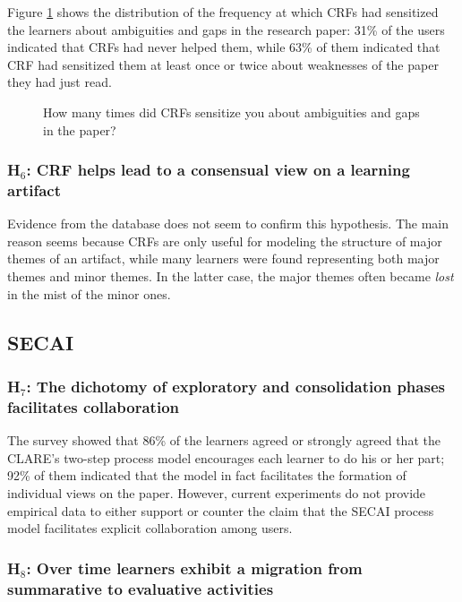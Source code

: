 Figure \ref{fig:ambiguity} shows the distribution of the frequency at which
CRFs had sensitized the learners about ambiguities and gaps in the research
paper: 31\% of the users indicated that CRFs had never helped them, while
63\% of them indicated that CRF had sensitized them at least once or twice
about weaknesses of the paper they had just read.

\begin{figure}[htbp]
  \caption{How many times did CRFs sensitize you about ambiguities and gaps
  in the paper?} 
  \label{fig:ambiguity}
\end{figure}


\subsubsection{H\(_6\): CRF helps lead to a consensual view on a learning
artifact}

Evidence from the database does not seem to confirm this hypothesis. The
main reason seems because CRFs are only useful for modeling the structure
of major themes of an artifact, while many learners were found representing
both major themes and minor themes. In the latter case, the major themes
often became {\it lost\/} in the mist of the minor ones.


\subsection{SECAI}

\subsubsection{H\(_7\): The dichotomy of exploratory and consolidation
phases facilitates collaboration}

The survey showed that 86\% of the learners agreed or strongly agreed that
the CLARE's two-step process model encourages each learner to do his or her
part; 92\% of them indicated that the model in fact facilitates the
formation of individual views on the paper. However, current experiments do
not provide empirical data to either support or counter the claim that the
SECAI process model facilitates explicit collaboration among users.



\subsubsection{H\(_8\): Over time learners exhibit a migration from
summarative to evaluative activities}

